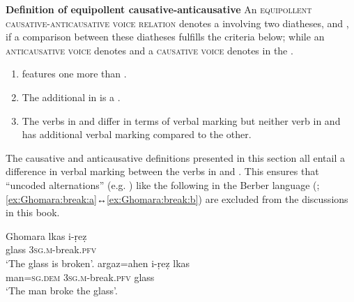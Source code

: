 \smallskip

\noindent
\begin{center}
	\begin{minipage}{0.80\textwidth}
		\textbf{Definition of equipollent causative-anticausative} \newline
		An \textsc{equipollent causative-anticausative voice relation} denotes a  involving two diatheses,  and , if a comparison between these diatheses fulfills the criteria below; while an \textsc{anticausative voice} denotes  and a \textsc{causative voice} denotes  in the .
		\begin{enumerate}[label=\roman*)]
			\item {} features one  more than .
			\item The additional  in  is a .
			\item The verbs in  and  differ in terms of verbal marking but neither verb in  and  has additional verbal marking compared to the other.
		\end{enumerate}
		\label{def:equipollent:causative-anticausative}
	\end{minipage}
\end{center}

\smallskip

The causative and anticausative definitions presented in this section all entail a difference in verbal marking between the verbs in  and . This ensures that “uncoded alternations” (e.g. \citealt[181ff.]{zuniga:kittila:2019}) like the following  in the Berber language  (; \ref{ex:Ghomara:break:a}↔\ref{ex:Ghomara:break:b}) are excluded from the discussions in this book.

\ea Ghomara \citep[317]{mourigh:2015}
\ea\label{ex:Ghomara:break:a}
	\gll	lkas 	i-ṛeẓ \\
			glass	\textsc{3sg.m}-break.\textsc{pfv}	\\
	\glt	‘The glass is broken’.
\ex\label{ex:Ghomara:break:b}
	\gll	argaz=ahen 				i-ṛeẓ								lkas	\\
			man=\textsc{sg.dem}	\textsc{3sg.m}-break.\textsc{pfv}	glass	\\
	\glt	‘The man broke the glass’.
	\z 
\z

